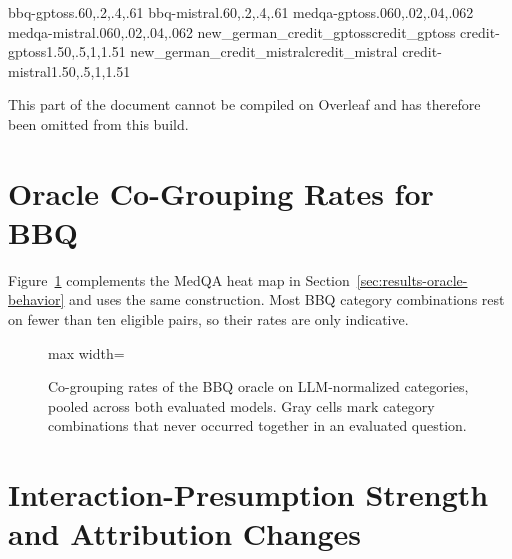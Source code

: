     {bbq-gptoss}{.6}{0,.2,.4,.6}{1}
    {bbq-mistral}{.6}{0,.2,.4,.6}{1}
    {medqa-gptoss}{.06}{0,.02,.04,.06}{2}
    {medqa-mistral}{.06}{0,.02,.04,.06}{2}
    {new_german_credit_gptoss}{credit_gptoss}%
    {credit-gptoss}{1.5}{0,.5,1,1.5}{1}
    {new_german_credit_mistral}{credit_mistral}%
    {credit-mistral}{1.5}{0,.5,1,1.5}{1}
  \tikzexternaldisable
\else
  \begin{tcolorbox}[
    colback=orange!12,
    colframe=orange!80!black,
    fonttitle=\bfseries,
    title={Compilation warning}
  ]
    This part of the document cannot be compiled on Overleaf and has therefore
    been omitted from this build.
  \end{tcolorbox}
\fi

\section{Oracle Co-Grouping Rates for BBQ}
\label{app:oracle-heatmap-bbq}

Figure~\ref{fig:oracle-heatmap-bbq} complements the MedQA heat map in Section~\ref{sec:results-oracle-behavior} and uses the same construction. Most BBQ category combinations rest on fewer than ten eligible pairs, so their rates are only indicative.

\begin{figure}[H]
  \centering
  \begin{adjustbox}{max width=\textwidth}
    \OracleHeatmapBBQ
  \end{adjustbox}
  \caption[Oracle co-grouping rates for BBQ]{Co-grouping rates of the BBQ oracle on LLM-normalized categories, pooled across both evaluated models. Gray cells mark category combinations that never occurred together in an evaluated question.}
  \label{fig:oracle-heatmap-bbq}
\end{figure}

\section{Interaction-Presumption Strength and Attribution Changes}
\label{app:rq1-scatter}

